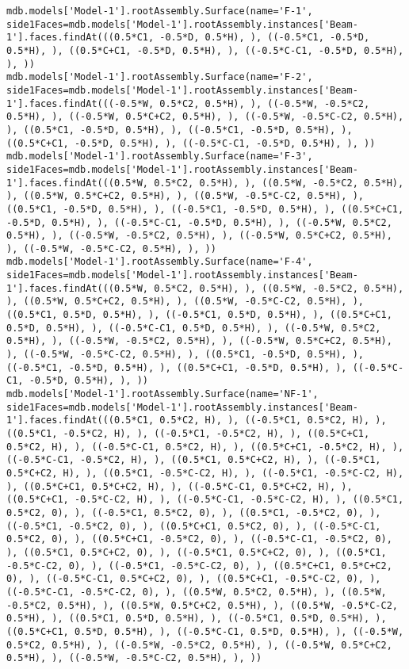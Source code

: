 \documentclass[12pt, letterpaper, oneside]{report}
\begin{document}
\begin{lstlisting}[frame=none]
mdb.models['Model-1'].rootAssembly.Surface(name='F-1', side1Faces=mdb.models['Model-1'].rootAssembly.instances['Beam-1'].faces.findAt(((0.5*C1, -0.5*D, 0.5*H), ), ((-0.5*C1, -0.5*D, 0.5*H), ), ((0.5*C+C1, -0.5*D, 0.5*H), ), ((-0.5*C-C1, -0.5*D, 0.5*H), ), ))
mdb.models['Model-1'].rootAssembly.Surface(name='F-2', side1Faces=mdb.models['Model-1'].rootAssembly.instances['Beam-1'].faces.findAt(((-0.5*W, 0.5*C2, 0.5*H), ), ((-0.5*W, -0.5*C2, 0.5*H), ), ((-0.5*W, 0.5*C+C2, 0.5*H), ), ((-0.5*W, -0.5*C-C2, 0.5*H), ), ((0.5*C1, -0.5*D, 0.5*H), ), ((-0.5*C1, -0.5*D, 0.5*H), ), ((0.5*C+C1, -0.5*D, 0.5*H), ), ((-0.5*C-C1, -0.5*D, 0.5*H), ), ))
mdb.models['Model-1'].rootAssembly.Surface(name='F-3', side1Faces=mdb.models['Model-1'].rootAssembly.instances['Beam-1'].faces.findAt(((0.5*W, 0.5*C2, 0.5*H), ), ((0.5*W, -0.5*C2, 0.5*H), ), ((0.5*W, 0.5*C+C2, 0.5*H), ), ((0.5*W, -0.5*C-C2, 0.5*H), ), ((0.5*C1, -0.5*D, 0.5*H), ), ((-0.5*C1, -0.5*D, 0.5*H), ), ((0.5*C+C1, -0.5*D, 0.5*H), ), ((-0.5*C-C1, -0.5*D, 0.5*H), ), ((-0.5*W, 0.5*C2, 0.5*H), ), ((-0.5*W, -0.5*C2, 0.5*H), ), ((-0.5*W, 0.5*C+C2, 0.5*H), ), ((-0.5*W, -0.5*C-C2, 0.5*H), ), ))
mdb.models['Model-1'].rootAssembly.Surface(name='F-4', side1Faces=mdb.models['Model-1'].rootAssembly.instances['Beam-1'].faces.findAt(((0.5*W, 0.5*C2, 0.5*H), ), ((0.5*W, -0.5*C2, 0.5*H), ), ((0.5*W, 0.5*C+C2, 0.5*H), ), ((0.5*W, -0.5*C-C2, 0.5*H), ), ((0.5*C1, 0.5*D, 0.5*H), ), ((-0.5*C1, 0.5*D, 0.5*H), ), ((0.5*C+C1, 0.5*D, 0.5*H), ), ((-0.5*C-C1, 0.5*D, 0.5*H), ), ((-0.5*W, 0.5*C2, 0.5*H), ), ((-0.5*W, -0.5*C2, 0.5*H), ), ((-0.5*W, 0.5*C+C2, 0.5*H), ), ((-0.5*W, -0.5*C-C2, 0.5*H), ), ((0.5*C1, -0.5*D, 0.5*H), ), ((-0.5*C1, -0.5*D, 0.5*H), ), ((0.5*C+C1, -0.5*D, 0.5*H), ), ((-0.5*C-C1, -0.5*D, 0.5*H), ), ))
mdb.models['Model-1'].rootAssembly.Surface(name='NF-1', side1Faces=mdb.models['Model-1'].rootAssembly.instances['Beam-1'].faces.findAt(((0.5*C1, 0.5*C2, H), ), ((-0.5*C1, 0.5*C2, H), ), ((0.5*C1, -0.5*C2, H), ), ((-0.5*C1, -0.5*C2, H), ), ((0.5*C+C1, 0.5*C2, H), ), ((-0.5*C-C1, 0.5*C2, H), ), ((0.5*C+C1, -0.5*C2, H), ), ((-0.5*C-C1, -0.5*C2, H), ), ((0.5*C1, 0.5*C+C2, H), ), ((-0.5*C1, 0.5*C+C2, H), ), ((0.5*C1, -0.5*C-C2, H), ), ((-0.5*C1, -0.5*C-C2, H), ), ((0.5*C+C1, 0.5*C+C2, H), ), ((-0.5*C-C1, 0.5*C+C2, H), ), ((0.5*C+C1, -0.5*C-C2, H), ), ((-0.5*C-C1, -0.5*C-C2, H), ), ((0.5*C1, 0.5*C2, 0), ), ((-0.5*C1, 0.5*C2, 0), ), ((0.5*C1, -0.5*C2, 0), ), ((-0.5*C1, -0.5*C2, 0), ), ((0.5*C+C1, 0.5*C2, 0), ), ((-0.5*C-C1, 0.5*C2, 0), ), ((0.5*C+C1, -0.5*C2, 0), ), ((-0.5*C-C1, -0.5*C2, 0), ), ((0.5*C1, 0.5*C+C2, 0), ), ((-0.5*C1, 0.5*C+C2, 0), ), ((0.5*C1, -0.5*C-C2, 0), ), ((-0.5*C1, -0.5*C-C2, 0), ), ((0.5*C+C1, 0.5*C+C2, 0), ), ((-0.5*C-C1, 0.5*C+C2, 0), ), ((0.5*C+C1, -0.5*C-C2, 0), ), ((-0.5*C-C1, -0.5*C-C2, 0), ), ((0.5*W, 0.5*C2, 0.5*H), ), ((0.5*W, -0.5*C2, 0.5*H), ), ((0.5*W, 0.5*C+C2, 0.5*H), ), ((0.5*W, -0.5*C-C2, 0.5*H), ), ((0.5*C1, 0.5*D, 0.5*H), ), ((-0.5*C1, 0.5*D, 0.5*H), ), ((0.5*C+C1, 0.5*D, 0.5*H), ), ((-0.5*C-C1, 0.5*D, 0.5*H), ), ((-0.5*W, 0.5*C2, 0.5*H), ), ((-0.5*W, -0.5*C2, 0.5*H), ), ((-0.5*W, 0.5*C+C2, 0.5*H), ), ((-0.5*W, -0.5*C-C2, 0.5*H), ), ))

\end{lstlisting}
\end{document}
